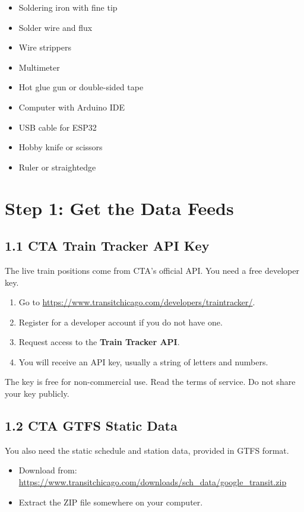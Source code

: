 \documentclass[11pt]{article}
\begin{document}
\begin{itemize}
    \item Soldering iron with fine tip
    \item Solder wire and flux
    \item Wire strippers
    \item Multimeter
    \item Hot glue gun or double-sided tape
    \item Computer with Arduino IDE
    \item USB cable for ESP32
    \item Hobby knife or scissors
    \item Ruler or straightedge
\end{itemize}

\section{Step 1: Get the Data Feeds}

\subsection{1.1 CTA Train Tracker API Key}

The live train positions come from CTA's official API. You need a free developer key.

\begin{enumerate}
    \item Go to \url{https://www.transitchicago.com/developers/traintracker/}.
    \item Register for a developer account if you do not have one.
    \item Request access to the \textbf{Train Tracker API}.
    \item You will receive an API key, usually a string of letters and numbers.
\end{enumerate}

The key is free for non-commercial use. Read the terms of service. Do not share your key publicly.

\subsection{1.2 CTA GTFS Static Data}

You also need the static schedule and station data, provided in GTFS format.

\begin{itemize}
    \item Download from: \url{https://www.transitchicago.com/downloads/sch_data/google_transit.zip}
    \item Extract the ZIP file somewhere on your computer.
\end{itemize}
\end{document}
